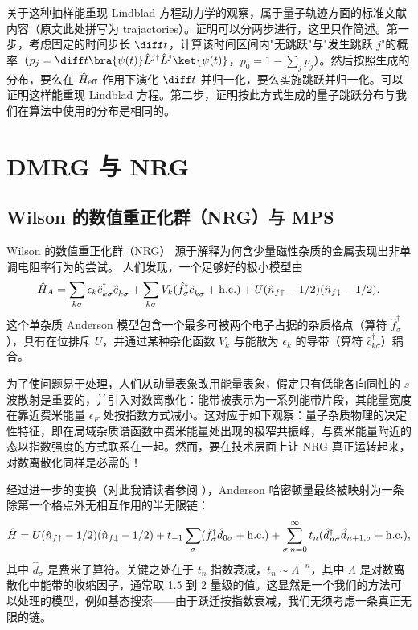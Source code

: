 关于这种抽样能重现 Lindblad 方程动力学的观察，属于量子轨迹方面的标准文献内容（原文此处拼写为 trajactories）。证明可以分两步进行，这里只作简述。第一步，考虑固定的时间步长 $\diff t$，计算该时间区间内"无跳跃"与"发生跳跃 $j$"的概率（$p_j = \diff t \bra{\psi(t)} \hat{L}^{j\dagger} \hat{L}^j \ket{\psi(t)}$，$p_0 = 1 - \sum_j p_j$）。然后按照生成的分布，要么在 $\hat{H}_{{\rm eff}}$ 作用下演化 $\diff t$ 并归一化，要么实施跳跃并归一化。可以证明这样能重现 Lindblad 方程。第二步，证明按此方式生成的量子跳跃分布与我们在算法中使用的分布是相同的。

\section{DMRG 与 NRG}
\subsection{Wilson 的数值重正化群（NRG）与 MPS}
Wilson 的数值重正化群（NRG）\cite{Wilson75,Bulla08,Krishnamurthy80} 源于解释为何含少量磁性杂质的金属表现出非单调电阻率行为的尝试。
人们发现，一个足够好的极小模型由
\begin{equation}
\hat{H}_A = \sum_{k\sigma} \epsilon_k \hat{c}^\dagger_{k\sigma} \hat{c}^{\phantom\dagger}_{k\sigma} + \sum_{k\sigma} V_k (\hat{f}^\dagger_\sigma \hat{c}^{\phantom\dagger}_{k\sigma} + {\rm h.c.}) + U (\hat{n}_{f\uparrow}-1/2) (\hat{n}_{f\downarrow}-1/2).
\end{equation}
这个单杂质 Anderson 模型包含一个最多可被两个电子占据的杂质格点（算符 $\hat{f}^\dagger_\sigma$），具有在位排斥 $U$，并通过某种杂化函数 $V_k$ 与能散为 $\epsilon_k$ 的导带（算符 $\hat{c}^\dagger_{k\sigma}$）耦合。

为了使问题易于处理，人们从动量表象改用能量表象，假定只有低能各向同性的 $s$ 波散射是重要的，并引入对数离散化：能带被表示为一系列能带片段，其能量宽度在靠近费米能量 $\epsilon_F$ 处按指数方式减小。这对应于如下观察：量子杂质物理的决定性特征，即在局域杂质谱函数中费米能量处出现的极窄共振峰，与费米能量附近的态以指数强度的方式联系在一起。然而，要在技术层面上让 NRG 真正运转起来，对数离散化同样是必需的！

经过进一步的变换（对此我请读者参阅 \cite{Wilson75,Bulla08}），Anderson 哈密顿量最终被映射为一条除第一个格点外无相互作用的半无限链：
\begin{equation} 
\hat{H}= U (\hat{n}_{f\uparrow}-1/2) (\hat{n}_{f\downarrow}-1/2) + t_{-1} \sum_\sigma (\hat{f}^\dagger_\sigma \hat{d}_{0\sigma} + {\rm h.c.}) + \sum_{\sigma,n=0}^\infty t_n (\hat{d}^\dagger_{n\sigma} \hat{d}_{n+1,\sigma} + {\rm h.c.}),
\end{equation}
其中 $\hat{d}_{\sigma}$ 是费米子算符。关键之处在于 $t_n$ 指数衰减，$t_n \sim \Lambda^{-n}$，其中 $\Lambda$ 是对数离散化中能带的收缩因子，通常取 1.5 到 2 量级的值。这显然是一个我们的方法可以处理的模型，例如基态搜索——由于跃迁按指数衰减，我们无须考虑一条真正无限的链。

